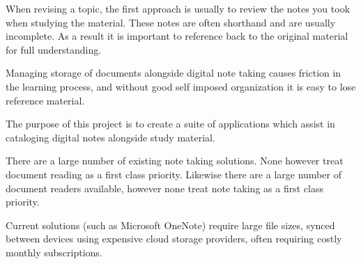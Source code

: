 
When revising a topic, the first approach is usually to review the notes you took when studying the material. These notes are often shorthand and are usually incomplete. As a result it is important to reference back to the original material for full understanding. 
	
Managing storage of documents alongside digital note taking causes friction in the learning process, and without good self imposed organization it is easy to lose reference material. 

The purpose of this project is to create a suite of applications which assist in cataloging digital notes alongside study material. 

There are a large number of existing note taking solutions. None however treat document reading as a first class priority. Likewise there are a large number of document readers available, however none treat note taking as a first class priority. 

Current solutions (such as Microsoft OneNote) require large file sizes, synced between devices using expensive cloud storage providers, often requiring costly monthly subscriptions.
